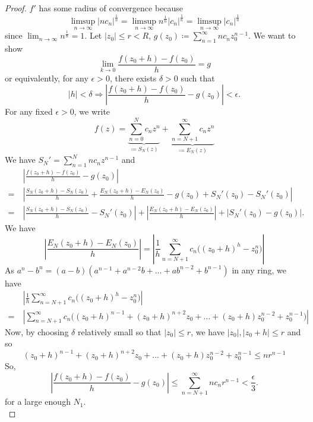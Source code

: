 \documentclass[11pt]{article}
\begin{document}
\begin{proof}
$f'$ has some radius of convergence because
\begin{equation*}
\limsup_{n\to\infty}|nc_n|^{\frac{1}{n}}
= \limsup_{n\to\infty}n^{\frac{1}{n}}|c_n|^{\frac{1}{n}}
= \limsup_{n\to\infty}|c_n|^{\frac{1}{n}}
\end{equation*}
since $\displaystyle\lim_{n\to\infty}n^{\frac{1}{n}} = 1$. Let $|z_0| \leq r <
R$, $\displaystyle g(z_0) \coloneqq \sum^\infty_{n=1} nc_nz_0^{n-1}$. We want to
show
\begin{equation*}
\lim_{k\to 0} \frac{f(z_0+h) - f(z_0)}{h} = g
\end{equation*}
or equivalently, for any $\epsilon > 0$, there exists $\delta > 0$ such that
\begin{equation*}
|h| < \delta \Rightarrow \left|\frac{f(z_0+h) - f(z_0)}{h} - g(z_0)\right| <
\epsilon.
\end{equation*}
For any fixed $\epsilon > 0$, we write
\begin{equation*}
f(z) = \underbrace{\sum^N_{n=0}c_nz^n}_{\coloneqq S_N(z)} +
\underbrace{\sum^\infty_{n=N+1}c_nz^n}_{\coloneqq E_N(z)} 
\end{equation*}
We have $S_N' = \sum^N_{n=1}nc_nz^{n-1}$ and
\begin{align*}
&\>\left|\frac{f(z_0+h) - f(z_0)}{h} - g(z_0)\right|\\
=&\> \left|\frac{S_N(z_0+h) - S_N(z_0)}{h} + \frac{E_N(z_0+h) - E_N(z_0)}{h} -
g(z_0) + S_N'(z_0) -S_N'(z_0)\right|\\
=&\> \left|\frac{S_N(z_0+h) - S_N(z_0)}{h} - S_N'(z_0) \right|
+ \left|\frac{E_N(z_0+h) - E_N(z_0)}{h}\right| + \left|S_N'(z_0) -
g(z_0)\right|.
\end{align*}
We have
\begin{equation*}
\left|\frac{E_N(z_0+h) - E_N(z_0)}{h}\right|
= \left|\frac{1}{h} \sum^\infty_{n=N+1}c_n \big((z_0+h)^h -z_0^n\big)\right|
\end{equation*}
As $a^n -b^n = (a-b)(a^{n-1} + a^{n-2}b + \dots+ab^{n-2} + b^{n-1})$ in any
ring, we have
\begin{align*}
&\>\left|\frac{1}{h} \sum^\infty_{n=N+1}c_n \big((z_0+h)^h -z_0^n\big)\right|\\
=&\> \left|\sum^{\infty}_{n=N+1}c_n\big((z_0+h)^{n-1} + (z_0+h)^{n+2}z_0 + \dots +
(z_0+h)z_0^{n-2} + z_0^{n-1}\big)\right|
\end{align*}
Now, by choosing $\delta$ relatively small so that $|z_0|\leq r $, we have
$|z_0|, |z_0+h| \leq r$ and so
\begin{equation*}
(z_0+h)^{n-1} + (z_0+h)^{n+2}z_0 + \dots + (z_0+h)z_0^{n-2} + z_0^{n-1} \leq nr^{n-1}
\end{equation*}
So,
\begin{equation*}
\left|\frac{f(z_0+h) - f(z_0)}{h} - g(z_0)\right| \leq
\sum^\infty_{n=N+1}nc_nr^{n-1} < \frac{\epsilon}{3}.
\end{equation*}
for a large enough $N_1$.\\


\end{proof}
\end{document}
